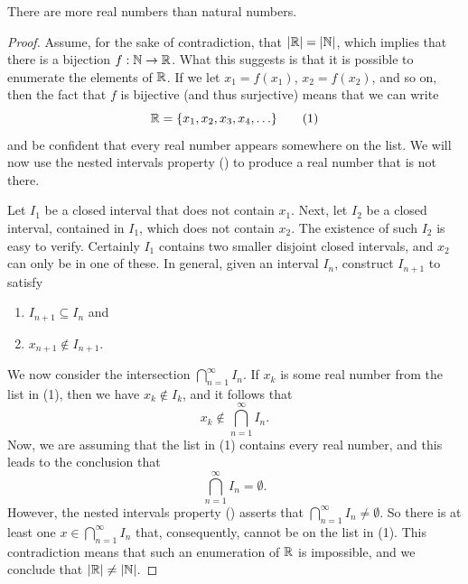 \documentclass[11pt,twoside=off,numbers=noenddot]{scrbook}
\begin{document}
\begin{theorem}[$\abs{\RR} > \abs{\NN}$]
    There are more real numbers than natural numbers.
\end{theorem}

\begin{proof}
    Assume, for the sake of contradiction, that $| \mathbb R | = | \mathbb N |$, which implies that there is a bijection $f : \mathbb N \to \mathbb R$. What this suggests is that it is possible to enumerate the elements of $\mathbb R$. If we let $x_1 = f(x_1)$, $x_2 = f(x_2)$, and so on, then the fact that $f$ is bijective (and thus surjective) means that we can write
    \[ \RR = \set{x_1, x_2, x_3, x_4, \dots} \tag{1} \]
    and be confident that every real number appears somewhere on the list. We will now use the nested intervals property () to produce a real number that is not there.

    Let $I_1$ be a closed interval that does not contain $x_1$. Next, let $I_2$ be a closed interval, contained in $I_1$, which does not contain $x_2$. The existence of such $I_2$ is easy to verify. Certainly $I_1$ contains two smaller disjoint closed intervals, and $x_2$ can only be in one of these. In general, given an interval $I_n$, construct $I_{n + 1}$ to satisfy
    \begin{enumerate}
        \item $I_{n + 1} \subseteq I_n$ and
        \item $x_{n + 1} \notin I_{n + 1}$.
    \end{enumerate}
    We now consider the intersection $\bigcap_{n = 1}^{\infty} I_n$. If $x_k$ is some real number from the list in (1), then we have $x_k \notin I_k$, and it follows that
    \[ x_k \notin \bigcap_{n = 1}^{\infty} I_n. \]
    Now, we are assuming that the list in (1) contains every real number, and this leads to the conclusion that
    \[ \bigcap_{n = 1}^{\infty} I_n = \emptyset. \]
    However, the nested intervals property () asserts that $\bigcap_{n = 1}^{\infty} I_n \neq \emptyset$. So there is at least one $x \in \bigcap_{n = 1}^{\infty} I_n$ that, consequently, cannot be on the list in (1). This contradiction means that such an enumeration of $\mathbb R$ is impossible, and we conclude that $| \mathbb R | \neq | \mathbb N |$.


\end{proof}
\end{document}
